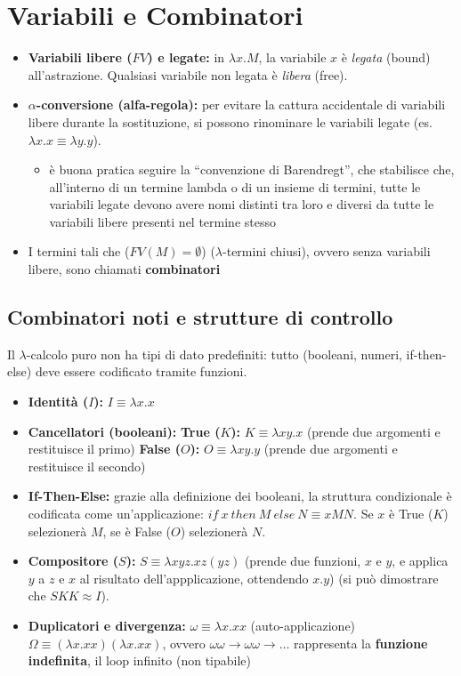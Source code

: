 \section{Variabili e Combinatori}
\begin{itemize}
    \item \textbf{Variabili libere ($FV$) e legate:} in $\lambda x. M$, la variabile $x$ è \textit{legata} (bound) all'astrazione. Qualsiasi variabile non legata è \textit{libera} (free).
    \item \textbf{$\alpha$-conversione (alfa-regola):} per evitare la cattura accidentale di variabili libere durante la sostituzione, si possono rinominare le variabili legate (es. $\lambda x.x \equiv \lambda y.y$). 
        \begin{itemize}
            \item è buona pratica seguire la ``convenzione di Barendregt'', che stabilisce che, all'interno di un termine lambda o di un insieme di termini, tutte le variabili legate devono avere nomi distinti tra loro e diversi da tutte le variabili libere presenti nel termine stesso
        \end{itemize} 
    \item  I termini tali che ($FV(M) = \emptyset$) ($\lambda$-termini chiusi), ovvero senza variabili libere, sono chiamati \textbf{combinatori}
\end{itemize}

\subsection{Combinatori noti e strutture di controllo}
Il $\lambda$-calcolo puro non ha tipi di dato predefiniti: tutto (booleani, numeri, if-then-else) deve essere codificato tramite funzioni.

\begin{itemize}
    \item \textbf{Identità ($I$):} $I \equiv \lambda x.x$
    \item \textbf{Cancellatori (booleani):}
        \subitem \textbf{True ($K$):} $K \equiv \lambda x y. x$ (prende due argomenti e restituisce il primo)
        \subitem \textbf{False ($O$):} $O \equiv \lambda x y. y$ (prende due argomenti e restituisce il secondo)
    \item \textbf{If-Then-Else:} grazie alla definizione dei booleani, la struttura condizionale è codificata come un'applicazione: $if\ x\ then\ M\ else\ N \equiv x M N$. Se $x$ è True ($K$) selezionerà $M$, se è False ($O$) selezionerà $N$.
    \item \textbf{Compositore ($S$):} $S \equiv \lambda x y z. x z (y z)$ (prende due funzioni, $x$ e $y$, e applica $y$ a $z$ e $x$ al risultato dell'appplicazione, ottendendo $x . y$)
        \subitem (si può dimostrare che $S K K \approx I$).
    \item \textbf{Duplicatori e divergenza:} 
        \subitem $\omega \equiv \lambda x.xx$ (auto-applicazione)
        \subitem $\Omega \equiv (\lambda x.xx) (\lambda x.xx)$, ovvero $\omega \omega \rightarrow \omega \omega \rightarrow \dots$ rappresenta la \textbf{funzione indefinita}, il loop infinito (non tipabile)
\end{itemize}

